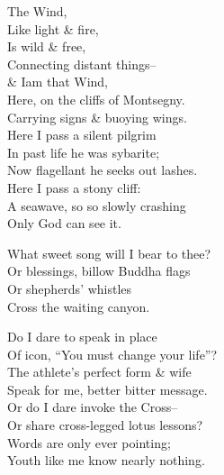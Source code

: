 The Wind, \\
Like light \& fire, \\
Is wild \& free, \\
Connecting distant things-- \\
\& Iam that Wind, \\
Here, on the cliffs of Montsegny. \\
Carrying signs \& buoying wings. \\
Here I pass a silent pilgrim \\
In past life he was sybarite; \\
Now flagellant he seeks out lashes. \\
Here I pass a stony cliff: \\
A seawave, so so slowly crashing \\
Only God can see it.

What sweet song will I bear to thee? \\
Or blessings, billow Buddha flags \\
Or shepherds' whistles  \\
Cross the waiting canyon. 

Do I dare to speak in place  \\
Of icon, ``You must change your life''? \\
The athlete's perfect form \& wife \\
Speak for me, better bitter message. \\
Or do I dare invoke the Cross-- \\
Or share cross-legged lotus lessons? \\
Words are only ever pointing; \\
Youth like me know nearly nothing.

